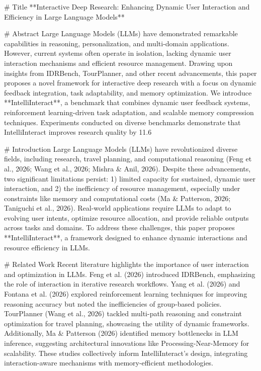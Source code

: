 # Title  
**Interactive Deep Research: Enhancing Dynamic User Interaction and Efficiency in Large Language Models**

# Abstract  
Large Language Models (LLMs) have demonstrated remarkable capabilities in reasoning, personalization, and multi-domain applications. However, current systems often operate in isolation, lacking dynamic user interaction mechanisms and efficient resource management. Drawing upon insights from IDRBench, TourPlanner, and other recent advancements, this paper proposes a novel framework for interactive deep research with a focus on dynamic feedback integration, task adaptability, and memory optimization. We introduce **IntelliInteract**, a benchmark that combines dynamic user feedback systems, reinforcement learning-driven task adaptation, and scalable memory compression techniques. Experiments conducted on diverse benchmarks demonstrate that IntelliInteract improves research quality by 11.6%

# Introduction  
Large Language Models (LLMs) have revolutionized diverse fields, including research, travel planning, and computational reasoning (Feng et al., 2026; Wang et al., 2026; Mishra & Anil, 2026). Despite these advancements, two significant limitations persist: 1) limited capacity for sustained, dynamic user interaction, and 2) the inefficiency of resource management, especially under constraints like memory and computational costs (Ma & Patterson, 2026; Taniguchi et al., 2026). Real-world applications require LLMs to adapt to evolving user intents, optimize resource allocation, and provide reliable outputs across tasks and domains. To address these challenges, this paper proposes **IntelliInteract**, a framework designed to enhance dynamic interactions and resource efficiency in LLMs.

# Related Work  
Recent literature highlights the importance of user interaction and optimization in LLMs. Feng et al. (2026) introduced IDRBench, emphasizing the role of interaction in iterative research workflows. Yang et al. (2026) and Fontana et al. (2026) explored reinforcement learning techniques for improving reasoning accuracy but noted the inefficiencies of group-based policies. TourPlanner (Wang et al., 2026) tackled multi-path reasoning and constraint optimization for travel planning, showcasing the utility of dynamic frameworks. Additionally, Ma & Patterson (2026) identified memory bottlenecks in LLM inference, suggesting architectural innovations like Processing-Near-Memory for scalability. These studies collectively inform IntelliInteract's design, integrating interaction-aware mechanisms with memory-efficient methodologies.

